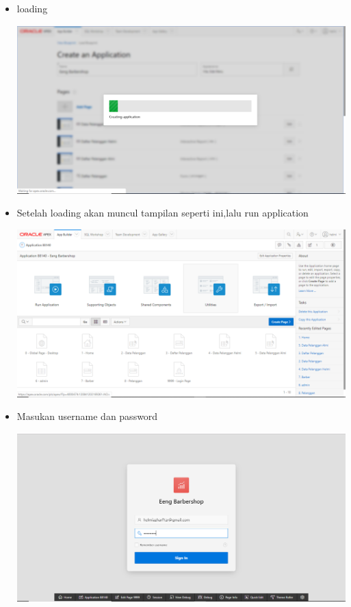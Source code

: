 ﻿\documentclass{article}
\begin{document}
\begin{itemize}
        \item loading
        \begin{center}
            \centering
            \includegraphics[scale=0.3]{gambar/17.PNG}
        \end{center}
        
         \item Setelah loading akan muncul tampilan seperti ini,lalu run application
        \begin{center}
            \centering
            \includegraphics[scale=0.3]{gambar/19.PNG}
        \end{center}
        
        \item Masukan username dan password
        \begin{center}
            \centering
            \includegraphics[scale=0.3]{gambar/20.PNG}
        \end{center}
        

\end{itemize}
\end{document}
